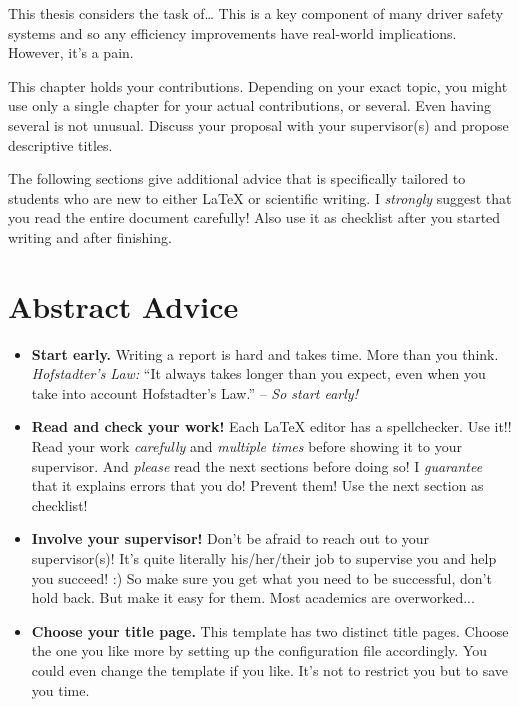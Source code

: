 
This thesis considers the task of\dots
%
This is a key component of many driver safety systems and so any efficiency improvements have real-world implications.
However, it's a pain.

This chapter holds your contributions. Depending on your exact topic, you might use only a single chapter for your actual contributions, or several. Even having several is not unusual. Discuss your proposal with your supervisor(s) and propose descriptive titles. 

The following sections give additional advice that is specifically tailored to students who are new to either \LaTeX{} or scientific writing. I \emph{strongly} suggest that you read the entire document carefully! Also use it as checklist after you started writing and after finishing.


\section{Abstract Advice}

\begin{itemize}
 \item \textbf{Start early.} Writing a report is hard and takes time. More than you think. \emph{Hofstadter's Law:} ``It always takes longer than you expect, even when you take into account Hofstadter's Law.'' -- \emph{So start early!}
 \item \textbf{Read and check your work!} Each \LaTeX{} editor has a spellchecker. Use it!! Read your work \emph{carefully} and \emph{multiple times} before showing it to your supervisor. And \emph{please} read the next sections before doing so! I \emph{guarantee} that it explains errors that you do! Prevent them! Use the next section as checklist!
 \item \textbf{Involve your supervisor!} Don't be afraid to reach out to your supervisor(s)! It's quite literally his/her/their job to supervise you and help you succeed! :) So make sure you get what you need to be successful, don't hold back. But make it easy for them. Most academics are overworked...
 \item \textbf{Choose your title page.} This template has two distinct title pages. Choose the one you like more by setting up the configuration file accordingly. You could even change the template if you like. It's not to restrict you but to save you time.

\end{itemize}

